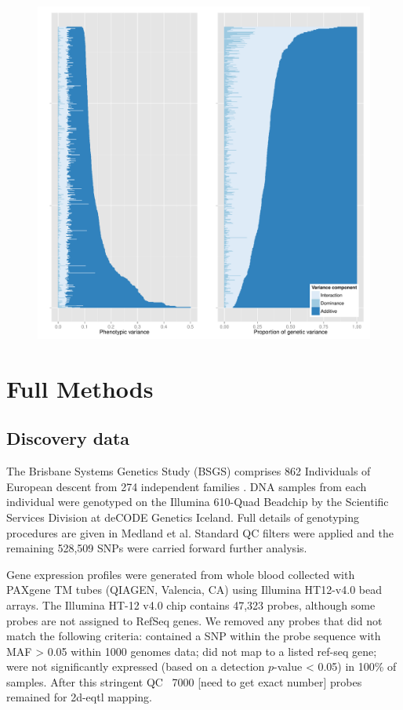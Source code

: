 \documentclass{article}
\begin{document}
\begin{figure}
\centering
\includegraphics[width=5in]{variance_components.pdf}
\caption{}
\end{figure}
\clearpage

\section{Full Methods}

\subsection{Discovery data}

The Brisbane Systems Genetics Study (BSGS) comprises 862 Individuals of European descent from 274 independent families \cite{pmid22563384}. DNA samples from each individual were genotyped on the Illumina 610-Quad Beadchip by the Scientific Services Division at deCODE Genetics Iceland. Full details of genotyping procedures are given in Medland et al. \cite{Medland2009} Standard QC filters were applied and the remaining 528,509 SNPs were carried forward further analysis. 

Gene expression profiles were generated from whole blood collected with PAXgene TM tubes (QIAGEN, Valencia, CA) using Illumina HT12-v4.0 bead arrays. The Illumina HT-12 v4.0 chip contains 47,323 probes, although some probes are not assigned to RefSeq genes. We removed any probes that did not match the following criteria: contained a SNP within the probe sequence with MAF > 0.05 within 1000 genomes data; did not map to a listed ref-seq gene; were not significantly expressed (based on a detection $p$-value < 0.05) in 100\% of samples. After this stringent QC ~7000 [need to get exact number] probes remained for 2d-eqtl mapping. 
\end{document}
